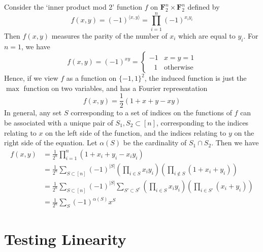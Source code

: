 \begin{example}
    Consider the `inner product mod 2' function $f$ on $\mathbf{F}_2^n \times \mathbf{F}_2^n$ defined by
    \[ f(x,y) = (-1)^{\langle x, y \rangle} = \prod_{i = 1}^n (-1)^{x_iy_i} \]
    Then $f(x,y)$ measures the parity of the number of $x_i$ which are equal to $y_i$. For $n = 1$, we have
    \[ f(x,y) = (-1)^{xy} = \begin{cases} -1 & x = y = 1 \\ \ \ \ 1 & \text{otherwise} \end{cases} \]
    Hence, if we view $f$ as a function on $\{ -1, 1 \}^2$, the induced function is just the $\max$ function on two variables, and has a Fourier representation
    \[ f(x,y) = \frac{1}{2}(1 + x + y - xy) \]
    In general, any set $S$ corresponding to a set of indices on the functions of $f$ can be associated with a unique pair of $S_1, S_2 \subset [n]$, corresponding to the indices relating to $x$ on the left side of the function, and the indices relating to $y$ on the right side of the equation. Let $\alpha(S)$ be the cardinality of $S_1 \cap S_2$. Then we have
    \begin{align*}
        f(x,y) &= \frac{1}{2^n} \prod_{i = 1}^n (1 + x_i + y_i - x_i y_i)\\
        &= \frac{1}{2^n} \sum_{S \subset [n]} (-1)^{|S|} \left( \prod_{i \in S} x_i y_i \right) \left( \prod_{i \not \in S} (1 + x_i + y_i) \right)\\
        &= \frac{1}{2^n} \sum_{S \subset [n]} (-1)^{|S|} \sum_{S' \subset S^c} \left( \prod_{i \in S} x_i y_i \right) \left( \prod_{i \in S'} (x_i + y_i) \right)\\
        &= \frac{1}{2^n} \sum_S (-1)^{\alpha(S)} x^S
    \end{align*}
\end{example}

\section{Testing Linearity}

